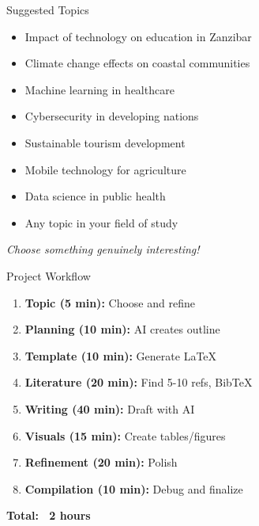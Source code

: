 \documentclass[aspectratio=169]{beamer}
\begin{document}
	\begin{frame}{Suggested Topics}
		\begin{itemize}
			\item Impact of technology on education in Zanzibar
			\item Climate change effects on coastal communities
			\item Machine learning in healthcare
			\item Cybersecurity in developing nations
			\item Sustainable tourism development
			\item Mobile technology for agriculture
			\item Data science in public health
			\item Any topic in your field of study
		\end{itemize}
		
		\vspace{0.5em}
		
		\textit{Choose something genuinely interesting!}
	\end{frame}
	
	\begin{frame}{Project Workflow}
		\begin{enumerate}
			\item \textbf{Topic (5 min):} Choose and refine
			\item \textbf{Planning (10 min):} AI creates outline
			\item \textbf{Template (10 min):} Generate LaTeX
			\item \textbf{Literature (20 min):} Find 5-10 refs, BibTeX
			\item \textbf{Writing (40 min):} Draft with AI
			\item \textbf{Visuals (15 min):} Create tables/figures
			\item \textbf{Refinement (20 min):} Polish
			\item \textbf{Compilation (10 min):} Debug and finalize
		\end{enumerate}
		
		\vspace{0.3em}
		
		\textbf{Total: ~2 hours}
	\end{frame}
	
\end{document}
